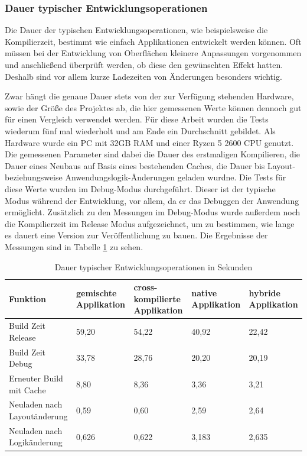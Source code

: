 \subsubsection{Dauer typischer Entwicklungsoperationen}
Die Dauer der typischen Entwicklungsoperationen, wie beispielsweise die Kompilierzeit, bestimmt wie einfach Applikationen entwickelt werden können. Oft müssen bei der Entwicklung von Oberflächen kleinere Anpassungen vorgenommen und anschließend überprüft werden, ob diese den gewünschten Effekt hatten. Deshalb sind vor allem kurze Ladezeiten von Änderungen besonders wichtig.

Zwar hängt die genaue Dauer stets von der zur Verfügung stehenden Hardware, sowie der Größe des Projektes ab, die hier gemessenen Werte können dennoch gut für einen Vergleich verwendet werden. 
Für diese Arbeit wurden die Tests wiederum fünf mal wiederholt und am Ende ein Durchschnitt gebildet. Als Hardware wurde ein PC mit 32GB RAM und einer Ryzen 5 2600 CPU genutzt. 
Die gemessenen Parameter sind dabei die Dauer des erstmaligen Kompilieren, die Dauer eines Neubaus auf Basis eines bestehenden Caches, die Dauer bis Layout- beziehungsweise Anwendungslogik-Änderungen geladen wurdne. 
Die Tests für diese Werte wurden im Debug-Modus durchgeführt. Dieser ist der typische Modus während der Entwicklung, vor allem, da er das Debuggen der Anwendung ermöglicht. Zusätzlich zu den Messungen im Debug-Modus wurde außerdem noch die Kompilierzeit im Release Modus aufgezeichnet, um zu bestimmen, wie lange es dauert eine Version zur Veröffentlichung zu bauen. Die Ergebnisse der Messungen sind in Tabelle \ref{tab:evaluations_build_time} zu sehen.

\begin{table}
\centering
\caption{Dauer typischer Entwicklungsoperationen in Sekunden}
\begin{tabular}{ |p{4cm}||p{2.5cm}|p{2.5cm}|p{2.5cm}|p{2.5cm}| }
 \hline
 Funktion & gemischte Applikation & cross-kompilierte Applikation & native Applikation & hybride Applikation \\
 \hline
 Build Zeit Release       &   59,20&   54,22& 40,92& 22,42\\
  \hline
 Build Zeit Debug  & 33,78& 28,76& 20,20& 20,19\\
  \hline
 Erneuter Build mit Cache & 8,80& 8,36& 3,36& 3,21\\
  \hline
 Neuladen nach Layoutänderung & 0,59& 0,60& 2,59& 2,64\\
  \hline
 Neuladen nach Logikänderung & 0,626& 0,622& 3,183& 2,635\\
  \hline
\end{tabular}
\label{tab:evaluations_build_time}
\end{table}

